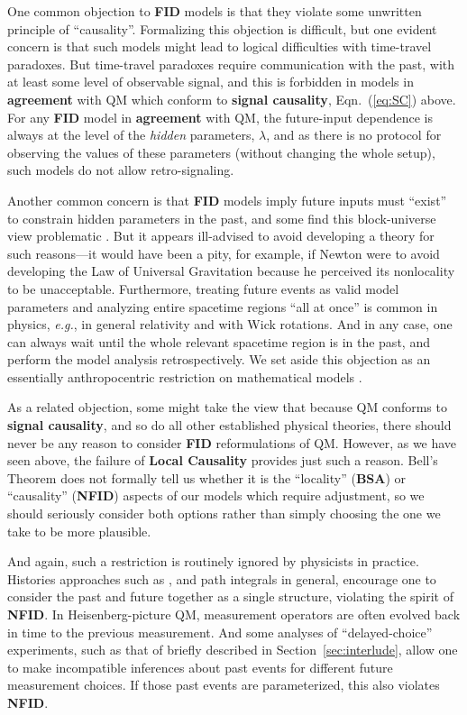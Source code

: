 \documentclass[onecolumn, nofootinbib, 12pt]{revtex4-1}
\begin{document}
One common objection to {\bf FID} models is that they violate some unwritten principle of ``causality''.  Formalizing this objection is difficult, but one evident concern is that such models might lead to logical difficulties with time-travel paradoxes.  But time-travel paradoxes require communication with the past, with at least some level of observable signal, and this is forbidden in models in {\bf agreement} with QM which conform to {\bf signal causality}, Eqn.~(\ref{eq:SC}) above.  For any {\bf FID} model in {\bf agreement} with QM, the future-input dependence is always at the level of the {\em hidden} parameters, $\lambda$, and as there is no protocol for observing the values of these parameters (without changing the whole setup), such models do not allow retro-signaling.

Another common concern is that {\bf FID} models imply future inputs must ``exist'' to constrain hidden parameters in the past, and some find this block-universe view problematic \cite{sorkin2007,kastner2017}.  But it appears ill-advised to avoid developing a theory for such reasons---it would have been a pity, for example, if Newton were to avoid developing the Law of Universal Gravitation because he perceived its nonlocality to be unacceptable.  Furthermore, treating future events as valid model parameters and analyzing entire spacetime regions ``all at once'' is common in physics, \emph{e.g.}, in general relativity and with Wick rotations.  And in any case, one can always wait until the whole relevant spacetime region is in the past, and perform the model analysis retrospectively.  We set aside this objection as an essentially anthropocentric restriction on mathematical models \cite{wharton2015a}.

As a related objection, some might take the view that because QM conforms to {\bf signal causality}, and so do all other established physical theories, there should never be any reason to consider {\bf FID} reformulations of QM.  However, as we have seen above, the failure of {\bf Local Causality} provides just such a reason.  Bell's Theorem does not formally tell us whether it is the ``locality'' ({\bf BSA}) or ``causality'' ({\bf NFID}) aspects of our models which require adjustment, so we should seriously consider both options rather than simply choosing the one we take to be more plausible.

And again, such a restriction is routinely ignored by physicists in practice.  Histories approaches such as \textcite{griffiths2001}, and path integrals in general, encourage one to consider the past and future together as a single structure, violating the spirit of {\bf NFID}.  In Heisenberg-picture QM, measurement operators are often evolved back in time to the previous measurement. And some analyses of ``delayed-choice'' experiments, such as that of \textcite{bohr1935} briefly described in Section~\ref{sec:interlude}, allow one to make incompatible inferences about past events for different future measurement choices.  If those past events are parameterized, this also violates {\bf NFID}.  
\end{document}
